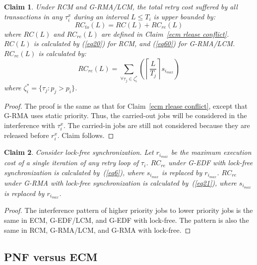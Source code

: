 \documentclass[12pt,english]{report}
\newtheorem{clm}{Claim}
\newtheorem{proof}{Proof}
\begin{document}
\begin{clm}\label{rcm rlease conflict}
Under RCM and G-RMA/LCM, the total retry cost suffered by all transactions in any $\tau_i^x$ during an interval $L\le T_i$ is upper bounded by:
\begin{equation}
RC_{to}(L)=RC(L)+RC_{re}(L)
\label{total rc rcm eq}
\end{equation}
%
where $RC(L)$ and $RC_{re}(L)$ are defined in Claim~\ref{ecm rlease conflict}. $RC(L)$ is calculated by (\ref{eq20}) for RCM, and (\ref{eq60}) for G-RMA/LCM. $RC_{re}(L)$ is calculated by:
\begin{equation}
RC_{re}(L)=\sum_{\forall \tau_j \in \zeta_i^*}\left(\left\lceil\frac{L}{T_j}\right\rceil s_{i_{max}}\right)\label{eq21}
\end{equation}
%
where $\zeta_i^*=\{\tau_j:p_j > p_i \}$.
\end{clm}
\begin{proof}\normalfont
The proof is the same as that for Claim~\ref{ecm rlease conflict}, except that G-RMA uses static priority. Thus, the carried-out jobs will be considered in the  interference with $\tau_i^x$. The carried-in jobs are still not considered because they are released before $r_i^x$. Claim follows.
\end{proof}
\begin{clm}\label{lock free release}
Consider lock-free synchronization. Let $r_{i_{max}}$ be the maximum execution cost of a single iteration of any retry loop of $\tau_i$. $RC_{re}$ under G-EDF  with lock-free synchronization is calculated by~(\ref{eq6}), where $s_{i_{max}}$ is replaced by $r_{i_{max}}$. $RC_{re}$ under G-RMA with lock-free synchronization is calculated by~(\ref{eq21}), where $s_{i_{max}}$ is replaced by $r_{i_{max}}$.
\end{clm}
%
\begin{proof}\normalfont
The interference pattern of higher priority jobs to lower priority jobs is the same in ECM, G-EDF/LCM, and G-EDF with lock-free. The pattern is also the same in RCM, G-RMA/LCM, and G-RMA with lock-free. 
\end{proof}


\subsection{PNF versus ECM\label{pnf vs ecm sec}}
\end{document}
